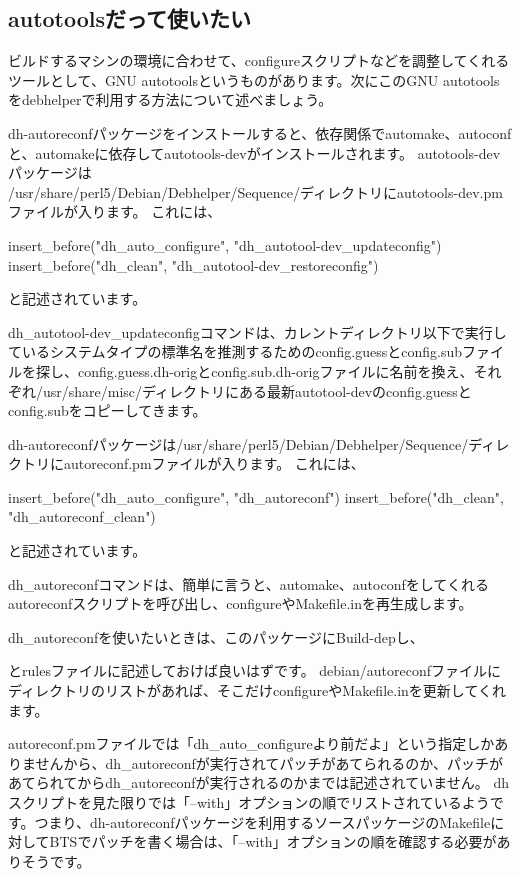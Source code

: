 \documentclass[mingoth,a4paper]{jsarticle}
\begin{document}
\subsection{autotoolsだって使いたい}

ビルドするマシンの環境に合わせて、configureスクリプトなどを調整してくれるツールとして、GNU autotoolsというものがあります。次にこのGNU autotoolsをdebhelperで利用する方法について述べましょう。

dh-autoreconfパッケージをインストールすると、依存関係でautomake、autoconfと、automakeに依存してautotools-devがインストールされます。
autotools-devパッケージは\\
/usr/share/perl5/Debian/Debhelper/Sequence/ディレクトリにautotools-dev.pmファイルが入ります。
これには、
\begin{commandline}
insert_before("dh_auto_configure", "dh_autotool-dev_updateconfig")
insert_before("dh_clean", "dh_autotool-dev_restoreconfig")
\end{commandline}
と記述されています。

dh\_autotool-dev\_updateconfigコマンドは、カレントディレクトリ以下で実行しているシステムタイプの標準名を推測するためのconfig.guessとconfig.subファイルを探し、config.guess.dh-origとconfig.sub.dh-origファイルに名前を換え、それぞれ/usr/share/misc/ディレクトリにある最新autotool-devのconfig.guessとconfig.subをコピーしてきます。

dh-autoreconfパッケージは/usr/share/perl5/Debian/Debhelper/Sequence/ディレクトリにautoreconf.pmファイルが入ります。
これには、
\begin{commandline}
insert_before("dh_auto_configure", "dh_autoreconf")
insert_before("dh_clean", "dh_autoreconf_clean")
\end{commandline}
と記述されています。

dh\_autoreconfコマンドは、簡単に言うと、automake、autoconfをしてくれるautoreconfスクリプトを呼び出し、configureやMakefile.inを再生成します。

dh\_autoreconfを使いたいときは、このパッケージにBuild-depし、
とrulesファイルに記述しておけば良いはずです。
debian/autoreconfファイルにディレクトリのリストがあれば、そこだけconfigureやMakefile.inを更新してくれます。

autoreconf.pmファイルでは「dh\_auto\_configureより前だよ」という指定しかありませんから、dh\_autoreconfが実行されてパッチがあてられるのか、パッチがあてられてからdh\_autoreconfが実行されるのかまでは記述されていません。
dhスクリプトを見た限りでは「--with」オプションの順でリストされているようです。つまり、dh-autoreconfパッケージを利用するソースパッケージのMakefileに対してBTSでパッチを書く場合は、「--with」オプションの順を確認する必要がありそうです。
\end{document}
